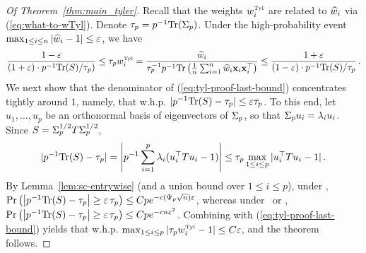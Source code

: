 \documentclass[times,sort&compress,3p]{elsarticle}
\begin{document}
\begin{proof}
    [Of Theorem~\ref{thm:main_tyler}]
    Recall that the weights $w^{\mbox{\tiny{Tyl}}}_i$ are related to $\widehat{w}_i$ via (\ref{eq:what-to-wTyl}).
Denote $\tau_p=p^{-1}\textrm{Tr}(\Sigma_p)$.
 Under the high-probability event $\max_{1\le i \le n}|\widehat{w}_i-1|\le \varepsilon$, we have
 \begin{equation}\label{eq:tyl-proof-last-bound}
    \frac{1-\varepsilon}{(1+\varepsilon) \cdot p^{-1}\textrm{Tr}(S)/\tau_p)} \le  \tau_pw^{\mbox{\tiny{Tyl}}}_i = \frac{ \widehat{w}_i}{\tau_p^{-1} p^{-1}\textrm{Tr} \left( \frac1n \sum_{i=1}^n \widehat{w}_i {\bf x}_i{\bf x}_i^\top  \right)} \le \frac{1+\varepsilon}{(1-\varepsilon) \cdot p^{-1}\textrm{Tr}(S)/\tau_p}\,. 
 \end{equation}
 We next show that the denominator of (\ref{eq:tyl-proof-last-bound}) concentrates tightly around $1$, namely, that w.h.p. $|p^{-1}\textrm{Tr}(S)-\tau_p|\le \varepsilon \tau_p$. To this end,  let $u_1,\ldots,u_p$ be an orthonormal basis of eigenvectors of $\Sigma_p$, so that $\Sigma_p u_i = \lambda_i u_i$. Since $S=\Sigma_p^{1/2}T\Sigma_p^{1/2}$, 
    \[
    |p^{-1}\textrm{Tr}(S)-\tau_p| = \left|p^{-1}\sum_{i=1}^p \lambda_i (u_i^\top T u_i -1)\right| \le \tau_p \max_{1\le i \le p} |u_i^\top T u_i-1| \,. 
    \]
    By Lemma~\ref{lem:sc-entrywise} (and a union bound over $1\le i \le p$), under \AssumLC, $\Pr\left( \left| p^{-1} \textrm{Tr}(S)-\tau_p\right| \ge \varepsilon \, \tau_p \right) \le Cpe^{-c(\Psi_p \sqrt{n})\varepsilon}$, whereas under \AssumIndep~or \AssumCCPSB, $\Pr\left( \left| p^{-1} \textrm{Tr}(S)-\tau_p\right| \ge \varepsilon \, \tau_p \right) \le Cpe^{-cn\varepsilon^2}$. Combining with (\ref{eq:tyl-proof-last-bound}) yields that w.h.p. $\max_{1\le i\le p}|\tau_pw^{\mbox{\tiny{Tyl}}}_i-1| \le C\varepsilon$, and the theorem follows.
    
\end{proof}

\end{document}
